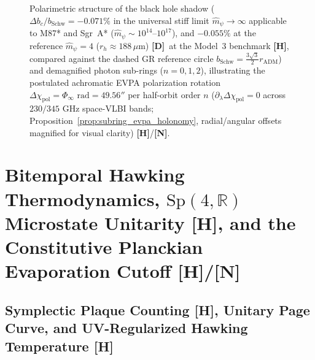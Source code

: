 \documentclass[11pt,a4paper]{article}
\newcommand{\catD}{\textbf{\textcolor{blue!75!black}{[D]}}}
\newcommand{\catH}{\textbf{\textcolor{orange!85!black}{[H]}}}
\newcommand{\catN}{\textbf{\textcolor{teal!75!black}{[N]}}}
\theoremstyle{plain}
\theoremstyle{definition}
\theoremstyle{remark}
\numberwithin{equation}{section}
\begin{document}
\begin{figure}[H]
\caption{Polarimetric structure of the black hole shadow ($\Delta b_c/b_{\text{Schw}} = -0.071\%$ in the universal stiff limit $\hat{m}_{\psi} \to \infty$ applicable to M87* and Sgr~A* ($\hat{m}_{\psi} \sim 10^{14}\text{--}10^{17}$), and $-0.055\%$ at the reference $\hat{m}_{\psi} = 4$ ($r_h \approx 188\,\mu\text{m}$) \catD\ at the Model~3 benchmark \catH, compared against the dashed GR reference circle $b_{\text{Schw}} = \frac{3\sqrt{3}}{2}r_{\text{ADM}}$) and demagnified photon sub-rings ($n = 0, 1, 2$), illustrating the postulated achromatic EVPA polarization rotation $\Delta\chi_{\text{pol}} = \Phi_{\infty}\text{ rad} = 49.56''$ per half-orbit order $n$ ($\partial_{\lambda}\Delta\chi_{\text{pol}} = 0$ across $230/345\text{ GHz}$ space-VLBI bands; Proposition~\ref{prop:subring_evpa_holonomy}, radial/angular offsets magnified for visual clarity) \catH/\catN.}
\label{fig:photon_ring_holonomy}
\end{figure}

\section{\texorpdfstring{Bitemporal Hawking Thermodynamics, $\text{Sp}(4,\mathbb{R})$ Microstate Unitarity \catH, and the Constitutive Planckian Evaporation Cutoff \catH/\catN}{Bitemporal Hawking Thermodynamics, Sp(4,R) Microstate Unitarity, and the Constitutive Planckian Evaporation Cutoff}}

\subsection{\texorpdfstring{Symplectic Plaque Counting \catH, Unitary Page Curve, and UV-Regularized Hawking Temperature \catH}{Symplectic Plaque Counting, Unitary Page Curve, and UV-Regularized Hawking Temperature}}
\end{document}
